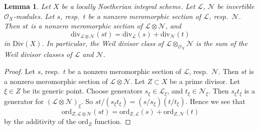 \documentclass[10pt,a4paper]{amsart}
\theoremstyle{plain}
\newtheorem{lemma}[subsection]{Lemma}
\theoremstyle{definition}
\theoremstyle{remark}
\numberwithin{equation}{subsection}
\begin{document}
\begin{lemma}
\label{lemma-c1-additive}
Let $X$ be a locally Noetherian integral scheme.
Let $\mathcal{L}$, $\mathcal{N}$ be invertible $\mathcal{O}_X$-modules.
Let $s$, resp.\ $t$ be a nonzero meromorphic section
of $\mathcal{L}$, resp.\ $\mathcal{N}$. Then $st$ is a nonzero
meromorphic section of $\mathcal{L} \otimes \mathcal{N}$, and
$$
\text{div}_{\mathcal{L} \otimes \mathcal{N}}(st)
=
\text{div}_\mathcal{L}(s) + \text{div}_\mathcal{N}(t)
$$
in $\text{Div}(X)$. In particular, the Weil divisor class of
$\mathcal{L} \otimes_{\mathcal{O}_X} \mathcal{N}$ is the sum
of the Weil divisor classes of $\mathcal{L}$ and $\mathcal{N}$.
\end{lemma}

\begin{proof}
Let $s$, resp.\ $t$ be a nonzero meromorphic section
of $\mathcal{L}$, resp.\ $\mathcal{N}$. Then $st$ is a nonzero
meromorphic section of $\mathcal{L} \otimes \mathcal{N}$.
Let $Z \subset X$ be a prime divisor. Let $\xi \in Z$ be its generic
point. Choose generators $s_\xi \in \mathcal{L}_\xi$, and
$t_\xi \in \mathcal{N}_\xi$. Then $s_\xi t_\xi$ is a generator
for $(\mathcal{L} \otimes \mathcal{N})_\xi$.
So $st/(s_\xi t_\xi) = (s/s_\xi)(t/t_\xi)$.
Hence we see that
$$
\text{ord}_{Z, \mathcal{L} \otimes \mathcal{N}}(st)
=
\text{ord}_{Z, \mathcal{L}}(s) + \text{ord}_{Z, \mathcal{N}}(t)
$$
by the additivity of the $\text{ord}_Z$ function.
\end{proof}
\end{document}
